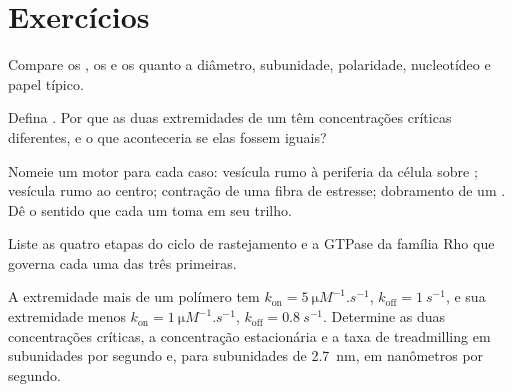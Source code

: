 \section{Exercícios}

\begin{exercise}[$\star$]\label{exo:b3:cytoskeleton-motility:1}
Compare os , os  e os  quanto a diâmetro, subunidade, polaridade, nucleotídeo e
papel típico.
\end{exercise}

\begin{exercise}[$\star$]\label{exo:b3:cytoskeleton-motility:2}
Defina . Por que as duas extremidades de um
 têm concentrações críticas diferentes, e o que
aconteceria se elas fossem iguais?
\end{exercise}

\begin{exercise}[$\star$]\label{exo:b3:cytoskeleton-motility:3}
Nomeie um motor para cada caso: vesícula rumo à periferia da célula
sobre ; vesícula rumo ao centro; contração de uma fibra de
estresse; dobramento de um . Dê o sentido que cada um toma em seu
trilho.
\end{exercise}

\begin{exercise}[$\star$]\label{exo:b3:cytoskeleton-motility:4}
Liste as quatro etapas do ciclo de rastejamento e a GTPase da família
Rho que governa cada uma das três primeiras.
\end{exercise}

\begin{exercise}[$\star\star$]\label{exo:b3:cytoskeleton-motility:5}
A extremidade mais de um polímero tem
$k_{\text{on}} = \qty{5}{\micro M^{-1}.s^{-1}}$,
$k_{\text{off}} = \qty{1}{s^{-1}}$, e sua extremidade menos
$k_{\text{on}} =
\qty{1}{\micro M^{-1}.s^{-1}}$,
$k_{\text{off}} = \qty{0.8}{s^{-1}}$. Determine as duas concentrações
críticas, a concentração estacionária e a taxa de treadmilling em
subunidades por segundo e, para subunidades de \qty{2.7}{nm}, em
nanômetros por segundo.
\end{exercise}

